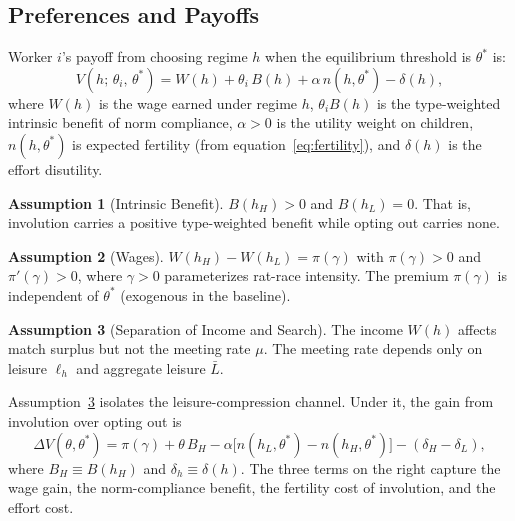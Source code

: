\documentclass[12pt]{article}
\theoremstyle{plain}
\theoremstyle{definition}
\newtheorem{assumption}{Assumption}
\theoremstyle{remark}
\newcommand{\tstar}{\theta^{*}}
\newcommand{\Lbar}{\bar{L}}
\newcommand{\hH}{h_{H}}
\newcommand{\hL}{h_{L}}
\newcommand{\DeltaV}{\Delta V}
\begin{document}
\subsection{Preferences and Payoffs}

Worker $i$'s payoff from choosing regime $h$ when the equilibrium threshold is
$\tstar$ is:
\begin{equation}
  V(h;\, \theta_{i},\, \tstar)
  = W(h) + \theta_{i}\, B(h) + \alpha\, n(h,\tstar) - \delta(h),
  \label{eq:payoff}
\end{equation}
where $W(h)$ is the wage earned under regime $h$, $\theta_{i} B(h)$ is the
type-weighted intrinsic benefit of norm compliance, $\alpha > 0$ is the utility
weight on children, $n(h,\tstar)$ is expected fertility (from
equation~\eqref{eq:fertility}), and $\delta(h)$ is the effort disutility.

\begin{assumption}[Intrinsic Benefit]
\label{ass:sc}
$B(\hH) > 0$ and $B(\hL) = 0$.  That is, involution carries a positive
type-weighted benefit while opting out carries none.
\end{assumption}

\begin{assumption}[Wages]
\label{ass:wage}
$W(\hH) - W(\hL) = \pi(\gamma)$ with $\pi(\gamma) > 0$ and
$\pi'(\gamma) > 0$, where $\gamma > 0$ parameterizes rat-race intensity.
The premium $\pi(\gamma)$ is independent of $\tstar$ (exogenous in the baseline).
\end{assumption}

\begin{assumption}[Separation of Income and Search]
\label{ass:sep}
The income $W(h)$ affects match surplus but not the meeting rate $\mu$.  The
meeting rate depends only on leisure $\ell_{h}$ and aggregate leisure $\Lbar$.
\end{assumption}

Assumption~\ref{ass:sep} isolates the leisure-compression channel.  Under it, the
gain from involution over opting out is
\begin{equation}
  \DeltaV(\theta, \tstar)
  = \pi(\gamma) + \theta\, B_{H}
    - \alpha\bigl[n(\hL,\tstar) - n(\hH,\tstar)\bigr]
    - (\delta_{H} - \delta_{L}),
  \label{eq:deltaV}
\end{equation}
where $B_{H} \equiv B(\hH)$ and $\delta_{h} \equiv \delta(h)$.  The three terms on
the right capture the wage gain, the norm-compliance benefit, the fertility cost of
involution, and the effort cost.
\end{document}

